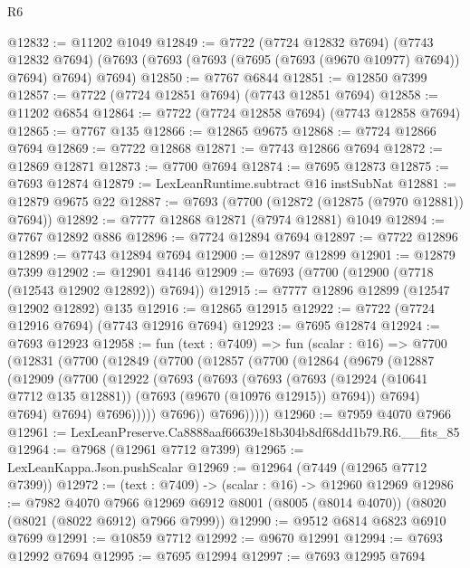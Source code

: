 \begin{lexlean}{R6}
\begin{coremodule}
@12832 := @11202 @1049
@12849 := @7722
    (@7724 @12832 @7694)
    (@7743 @12832 @7694)
    (@7693 (@7693 (@7693 (@7695 (@7693 (@9670 @10977) @7694)) @7694) @7694) @7694)
@12850 := @7767 @6844
@12851 := @12850 @7399
@12857 := @7722 (@7724 @12851 @7694) (@7743 @12851 @7694)
@12858 := @11202 @6854
@12864 := @7722 (@7724 @12858 @7694) (@7743 @12858 @7694)
@12865 := @7767 @135
@12866 := @12865 @9675
@12868 := @7724 @12866 @7694
@12869 := @7722 @12868
@12871 := @7743 @12866 @7694
@12872 := @12869 @12871
@12873 := @7700 @7694
@12874 := @7695 @12873
@12875 := @7693 @12874
@12879 := LexLeanRuntime.subtract @16 instSubNat
@12881 := @12879 @9675 @22
@12887 := @7693 (@7700 (@12872 (@12875 (@7970 @12881)) @7694))
@12892 := @7777 @12868 @12871 (@7974 @12881) @1049
@12894 := @7767 @12892 @886
@12896 := @7724 @12894 @7694
@12897 := @7722 @12896
@12899 := @7743 @12894 @7694
@12900 := @12897 @12899
@12901 := @12879 @7399
@12902 := @12901 @4146
@12909 := @7693 (@7700 (@12900 (@7718 (@12543 @12902 @12892)) @7694))
@12915 := @7777 @12896 @12899 (@12547 @12902 @12892) @135
@12916 := @12865 @12915
@12922 := @7722 (@7724 @12916 @7694) (@7743 @12916 @7694)
@12923 := @7695 @12874
@12924 := @7693 @12923
@12958 := fun (text : @7409) =>
  fun (scalar : @16) =>
  @7700
    (@12831
      (@7700
        (@12849
          (@7700
            (@12857
              (@7700
                (@12864
                  (@9679
                    (@12887
                      (@12909
                        (@7700
                          (@12922
                            (@7693
                              (@7693
                                (@7693
                                  (@7693
                                    (@12924 (@10641 @7712 @135 @12881))
                                    (@7693 (@9670 (@10976 @12915)) @7694))
                                  @7694)
                                @7694)
                              @7694)
                            @7696)))))
                  @7696))
              @7696)))))
@12960 := @7959 @4070 @7966
@12961 := LexLeanPreserve.Ca8888aaf66639e18b304b8df68dd1b79.R6.__fits_85
@12964 := @7968 (@12961 @7712 @7399)
@12965 := LexLeanKappa.Json.pushScalar
@12969 := @12964 (@7449 (@12965 @7712 @7399))
@12972 := (text : @7409) -> (scalar : @16) -> @12960 @12969
@12986 := @7982
    @4070
    @7966
    @12969
    @6912
    @8001
    (@8005 (@8014 @4070))
    (@8020 (@8021 (@8022 @6912) @7966 @7999))
@12990 := @9512 @6814 @6823 @6910 @7699
@12991 := @10859 @7712
@12992 := @9670 @12991
@12994 := @7693 @12992 @7694
@12995 := @7695 @12994
@12997 := @7693 @12995 @7694

\end{coremodule}
\end{lexlean}
